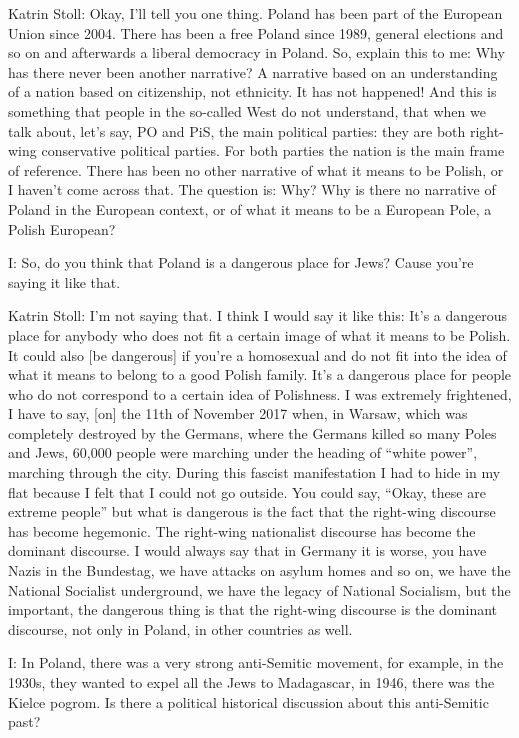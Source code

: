  

Katrin Stoll: Okay, I’ll tell you one thing. Poland has been part of the European Union since 2004. There has been a free Poland since 1989, general elections and so on and afterwards a liberal democracy in Poland. So, explain this to me: Why has there never been another narrative? A narrative based on an understanding of a nation based on citizenship, not ethnicity. It has not happened! And this is something that people in the so-called West do not understand, that when we talk about, let’s say, PO and PiS, the main political parties: they are both right-wing conservative political parties. For both parties the nation is the main frame of reference. There has been no other narrative of what it means to be Polish, or I haven’t come across that. The question is: Why? Why is there no narrative of Poland in the European context, or of what it means to be a European Pole, a Polish European? 

 

I: So, do you think that Poland is a dangerous place for Jews? Cause you’re saying it like that.  
 

Katrin Stoll: I’m not saying that. I think I would say it like this: It’s a dangerous place for anybody who does not fit a certain image of what it means to be Polish. It could also [be dangerous] if you’re a homosexual and do not fit into the idea of what it means to belong to a good Polish family. It’s a dangerous place for people who do not correspond to a certain idea of Polishness. I was extremely frightened, I have to say, [on] the 11th of November 2017 when, in Warsaw, which was completely destroyed by the Germans, where the Germans killed so many Poles and Jews, 60,000 people were marching under the heading of “white power”, marching through the city. During this fascist manifestation I had to hide in my flat because I felt that I could not go outside. You could say, “Okay, these are extreme people” but what is dangerous is the fact that the right-wing discourse has become hegemonic. The right-wing nationalist discourse has become the dominant discourse. I would always say that in Germany it is worse, you have Nazis in the Bundestag, we have attacks on asylum homes and so on, we have the National Socialist underground, we have the legacy of National Socialism, but the important, the dangerous thing is that the right-wing discourse is the dominant discourse, not only in Poland, in other countries as well.  

 

I: In Poland, there was a very strong anti-Semitic movement, for example, in the 1930s, they wanted to expel all the Jews to Madagascar, in 1946, there was the Kielce pogrom. Is there a political historical discussion about this anti-Semitic past? 

